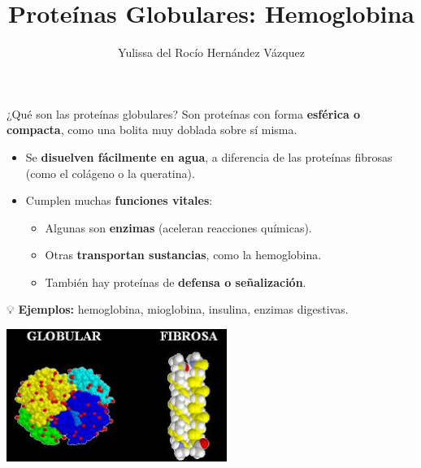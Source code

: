 \documentclass[
  ignorenonframetext,
]{beamer}
\title{Proteínas Globulares: Hemoglobina}
\author{Yulissa del Rocío Hernández Vázquez}
\date{}
\providecommand{\tightlist}{%
  \setlength{\itemsep}{0pt}\setlength{\parskip}{0pt}}
\begin{document}
\frame{\titlepage}


\begin{frame}{¿Qué son las proteínas globulares?}
\label{quuxe9-son-las-proteuxednas-globulares}
Son proteínas con forma \textbf{esférica o compacta}, como una bolita
muy doblada sobre sí misma.

\begin{itemize}
\tightlist
\item
  Se \textbf{disuelven fácilmente en agua}, a diferencia de las
  proteínas fibrosas (como el colágeno o la queratina).
\item
  Cumplen muchas \textbf{funciones vitales}:

  \begin{itemize}
  \tightlist
  \item
    Algunas son \textbf{enzimas} (aceleran reacciones químicas).
  \item
    Otras \textbf{transportan sustancias}, como la hemoglobina.
  \item
    También hay proteínas de \textbf{defensa o señalización}.
  \end{itemize}
\end{itemize}

💡 \textbf{Ejemplos:} hemoglobina, mioglobina, insulina, enzimas
digestivas.

\begin{center}
\includegraphics[width=0.45\linewidth,height=\textheight,keepaspectratio]{globulares.png}
\end{center}
\end{frame}
\end{document}
